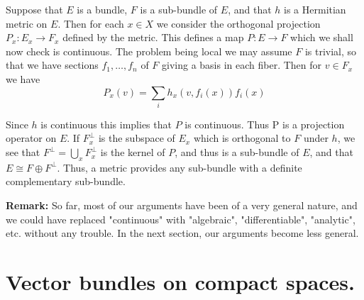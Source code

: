 Suppose that $E$ is a bundle, $F$ is a sub-bundle of $E$, and that $h$ is a Hermitian metric on $E$. Then for each $x \in X$ we consider the orthogonal projection $P_x: E_x \to F_x$ defined by the metric. This defines a map $P: E \to F$ which we shall now check is continuous. The problem being local we may assume $F$ is trivial, so that we have sections $f_1, \ldots, f_n$ of $F$ giving a basis in each fiber. Then for $v \in F_x$ we have
\begin{equation}
P_x(v) = \sum_i h_x(v, f_i(x))f_i(x)
\end{equation}

Since $h$ is continuous this implies that $P$ is continuous. Thus P is a projection operator on $E$. If $F_x^\bot$ is the subspace of $E_x$ which is orthogonal to $F$ under $h$, we see that $F^\bot = \bigcup_x F_x^\bot$ is the kernel of $P$, and thus is a sub-bundle of $E$, and that $E \cong F \oplus F^\bot$. Thus, a metric provides any sub-bundle with a definite complementary sub-bundle. \par \pagebreak

\textbf{Remark:} So far, most of our arguments have been of a very general nature, and we could have replaced "continuous" with "algebraic", "differentiable", "analytic", etc. without any trouble. In the next section, our arguments become less general. \newpage


\section{Vector bundles on compact spaces.}
